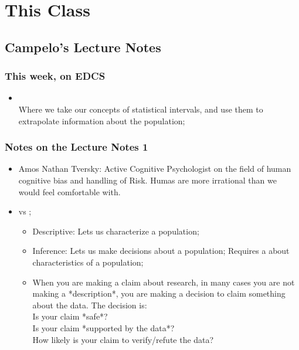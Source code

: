 \documentclass[t]{beamer}
\begin{document}
\section{This Class}
\subsection{Campelo's Lecture Notes}

\begin{frame}
  \frametitle{This week, on EDCS}
  
  \begin{itemize}
  \item {}\\ 
    Where we take our concepts of statistical intervals, and use them
    to extrapolate information about the population;
  \end{itemize}
\end{frame}

\begin{frame}
  \frametitle{Notes on the Lecture Notes 1}
  {\smaller
    \begin{itemize}
    \item Amos Nathan Tversky: Active Cognitive Psychologist on the
      field of human cognitive bias and handling of Risk. Humas are
      more irrational than we would feel comfortable with.
    \item {} vs ;
      \begin{itemize}
      \item Descriptive: Lets us characterize a population;
      \item Inference: Lets us make decisions about a population;
        Requires a  about
        characteristics of a population;
      \item When you are making a claim about research, in many cases
        you are not making a *description*, you are making a decision
        to claim something about the data. The decision is:\\
        Is your claim *safe*?\\
        Is your claim *supported by the data*?\\
        How likely is your claim to verify/refute the data?
      \end{itemize}
    \end{itemize}
  }
\end{frame}
\end{document}
